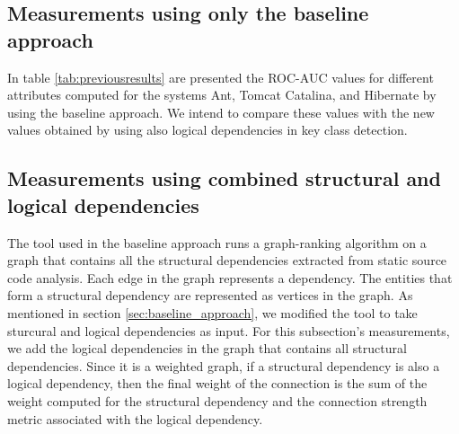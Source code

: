 \documentclass[runningheads]{comsis2}
\begin{document}
\subsection{Measurements using only the baseline approach}
\label{sec:measure_baseline}

In table \ref{tab:previousresults} are presented the ROC-AUC values for different attributes computed for the systems Ant, Tomcat Catalina, and Hibernate by using the baseline approach. We intend to compare these values with the new values obtained by using also logical dependencies in key class detection.

\begin{table}[!h]
\renewcommand{\arraystretch}{1}
\caption{ROC-AUC metric values extracted. }
\label{tab:previousresults}
\centering
{}
\end{table}





\subsection{Measurements using combined structural and logical dependencies}
\label{sec:measure_ld_sd}

The tool used in the baseline approach runs a graph-ranking algorithm on a graph that contains all the structural dependencies extracted from static source code analysis.
Each edge in the graph represents a dependency. The entities that form a structural dependency are represented as vertices in the graph. 
As mentioned in section \ref{sec:baseline_approach}, we modified the tool to take sturcural and logical dependencies as input.
For this subsection's measurements, we add the logical dependencies in the graph that contains all structural dependencies. Since it is a weighted graph, if a structural dependency is also a logical dependency, then the final weight of the connection is the sum of the weight computed for the structural dependency and the connection strength metric associated with the logical dependency.
\end{document}
